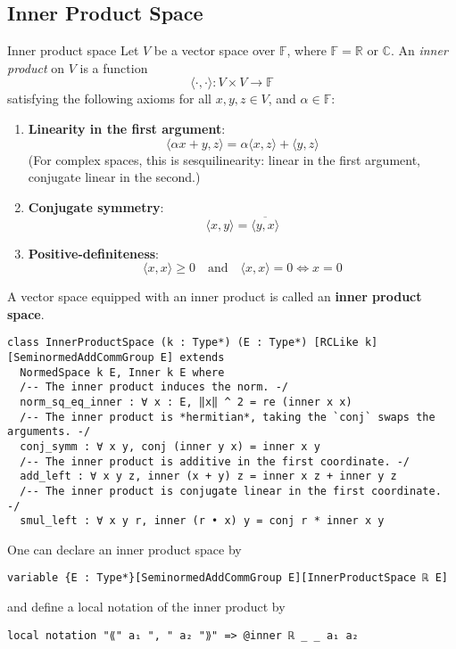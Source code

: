 \documentclass[a4paper]{article}
\begin{document}
\subsection{Inner Product Space}

\begin{dfn}{Inner product space}
Let \( V \) be a vector space over \( \mathbb{F} \), where \( \mathbb{F} = \mathbb{R} \) or \( \mathbb{C} \). An \emph{inner product} on \( V \) is a function
\[
\langle \cdot, \cdot \rangle : V \times V \to \mathbb{F}
\]
satisfying the following axioms for all \( x, y, z \in V \), and \( \alpha \in \mathbb{F} \):
\begin{enumerate}
  \item \textbf{Linearity in the first argument}:
  \[
  \langle \alpha x + y, z \rangle = \alpha \langle x, z \rangle + \langle y, z \rangle
  \]
  (For complex spaces, this is sesquilinearity: linear in the first argument, conjugate linear in the second.)

  \item \textbf{Conjugate symmetry}:
  \[
  \langle x, y \rangle = \overline{\langle y, x \rangle}
  \]

  \item \textbf{Positive-definiteness}:
  \[
  \langle x, x \rangle \ge 0 \quad \text{and} \quad \langle x, x \rangle = 0 \iff x = 0
  \]
\end{enumerate}
A vector space equipped with an inner product is called an \textbf{inner product space}.
\begin{lstlisting}[style = lean]
class InnerProductSpace (k : Type*) (E : Type*) [RCLike k] [SeminormedAddCommGroup E] extends
  NormedSpace k E, Inner k E where
  /-- The inner product induces the norm. -/
  norm_sq_eq_inner : ∀ x : E, ‖x‖ ^ 2 = re (inner x x)
  /-- The inner product is *hermitian*, taking the `conj` swaps the arguments. -/
  conj_symm : ∀ x y, conj (inner y x) = inner x y
  /-- The inner product is additive in the first coordinate. -/
  add_left : ∀ x y z, inner (x + y) z = inner x z + inner y z
  /-- The inner product is conjugate linear in the first coordinate. -/
  smul_left : ∀ x y r, inner (r • x) y = conj r * inner x y
\end{lstlisting}
\end{dfn}
One can declare an inner product space by
\begin{xmp}{}
\begin{lstlisting}[style = lean]
variable {E : Type*}[SeminormedAddCommGroup E][InnerProductSpace ℝ E]
\end{lstlisting}
and define a local notation of the inner product by
\begin{lstlisting}[style = lean]
local notation "⟪" a₁ ", " a₂ "⟫" => @inner ℝ _ _ a₁ a₂
\end{lstlisting}
\end{xmp}
\end{document}
